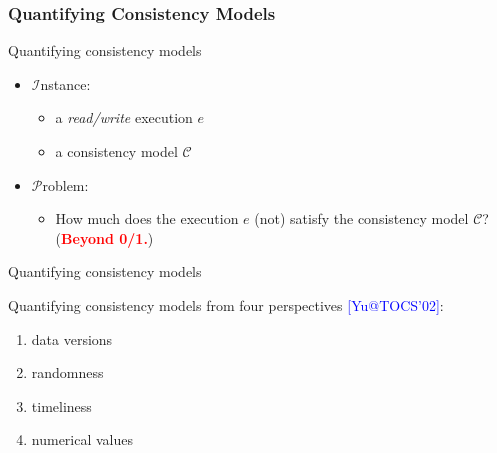 \documentclass{beamer}
\makeatletter
\newcommand{\citeinbeamer}[3]{{\scriptsize{\textcolor{blue}{[#1@#2'#3]}}}}
\newcommand{\fig}[3]
{
  \begin{figure}[htp]
    \centering
      \texttt{[image: \#2]}
      \caption[labelInTOC]{#3}
  \end{figure}
}
\newcommand{\boxedpoint}[1]{
  \begin{center}
    \fbox{\textcolor{red}{\bf #1}}
  \end{center}
}
\newcommand{\blockred}[1]{\textcolor{red}{\bf #1}}
\makeatother
\begin{document}
\subsubsection{Quantifying Consistency Models}

\begin{frame}{Quantifying consistency models}
  \begin{definition}
    \begin{itemize}
      \setlength{\itemsep}{0.40cm}
      \item $\mathcal{I}$nstance:
		\begin{itemize}
		  \item a \emph{read/write} execution $e$
		  \item a consistency model $\mathcal{C}$
		\end{itemize}
      \item $\mathcal{P}$roblem:
        \begin{itemize}
		  \item How much does the execution $e$ (not) satisfy the consistency model
		  $\mathcal{C}$? (\blockred{Beyond 0/1.})
		\end{itemize}
    \end{itemize}
  \end{definition}
\end{frame}
\begin{frame}[label = quantify-main]{Quantifying consistency models}
  \begin{block}{Quantifying consistency models from four perspectives
  \citeinbeamer{Yu}{TOCS}{02}:}
    \begin{enumerate}
      \item data versions
      \item randomness
      \item timeliness \hyperlink{quantify-timeliness-backup}{}
      \item numerical values
      \hyperlink{quantify-numerical-values-backup}{}
    \end{enumerate}
  \end{block}

\end{frame}

\end{document}
